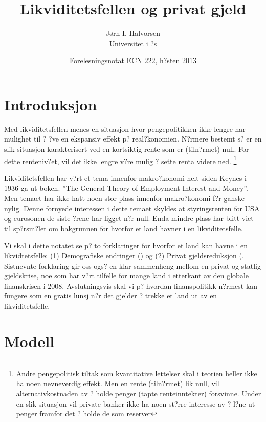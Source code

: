 \documentclass[a4paper,notitlepage]{article}
\begin{document}
\title[Triola kapittel 1]{Likviditetsfellen og privat gjeld}
\author[JIH]{J\o rn I. Halvorsen \\ Universitet i ?s}
\date[Sj\o krigsskolen 2007]{Forelesningsnotat ECN 222, h?sten 2013}
\maketitle
\section{Introduksjon}
Med likviditetsfellen menes en situasjon hvor pengepolitikken ikke lengre har mulighet til ? ?ve en ekspansiv effekt p? real?konomien. N?rmere bestemt s? er en slik situasjon karakterisert ved en kortsiktig rente som er (tiln?rmet) null. For dette renteniv?et, vil det ikke lengre v?re mulig ? sette renta videre ned.
\footnote{ Andre pengepolitisk tiltak som kvantitative lettelser skal i teorien heller ikke ha noen nevneverdig effekt. Men en rente (tiln?rmet) lik null, vil alternativkostnaden av ? holde penger (tapte renteinntekter) forsvinne. Under en slik situasjon vil private banker ikke ha noen st?rre interesse av ? l?ne ut penger framfor det ? holde de som reserver}


Likviditetsfellen har v?rt et tema innenfor makro?konomi helt siden Keynes i 1936 ga ut boken. ''The General Theory of Employment Interest and Money''. Men temaet har ikke hatt noen stor plass innenfor makro?konomi f?r ganske nylig. Denne fornyede interessen i dette temaet skyldes at styringsrenten for USA og eurosonen de siste ?rene har ligget n?r null. Enda mindre plass har blitt viet til sp?rsm?let om bakgrunnen for hvorfor et land havner i en likviditetsfelle.

Vi skal i dette notatet se p? to forklaringer for hvorfor et land kan havne i en likvidtetsfelle: (1) Demografiske endringer (\cite{krugman1998s}) og (2) Privat gjeldsreduksjon (\cite{eggertsson2012debt}. Sistnevnte forklaring gir oss ogs? en klar sammenheng mellom en privat og statlig gjeldskrise, noe som har v?rt tilfelle for mange land i etterkant av den globale finanskrisen i 2008. Avslutningsvis skal vi p? hvordan finanspolitikk n?rmest kan fungere som en gratis lunsj n?r det gjelder ? trekke et land ut av en likviditetsfelle.
\section{Modell}
\end{document}
